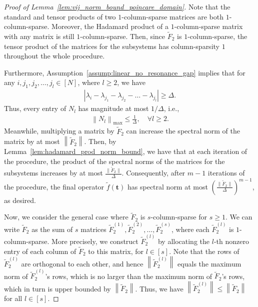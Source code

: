 \documentclass[superscriptaddress,onecolumn,nofootinbib,longbibliography,a4paper,accepted=2026-09-29]{quantumarticle}
\theoremstyle{plain}
\theoremstyle{definition}
\numberwithin{thm}{section}
\numberwithin{assumption}{section}
\numberwithin{lemma}{section}
\numberwithin{prop}{section}
\numberwithin{cor}{section}
\numberwithin{definition}{section}
\numberwithin{rmk}{section}
\numberwithin{equation}{section}
\newcommand{\norm}[1]     {\left\| #1 \right\|}
\newcommand{\mbt}{\mathbf{t}}
\begin{document}
\begin{proof}[Proof of Lemma~\ref{lem:vij_norm_bound_poincare_domain}]
Note that the standard and tensor products of two \(1\)-column-sparse matrices are both \(1\)-column-sparse. Moreover, the Hadamard product of a \(1\)-column-sparse matrix with any matrix is still \(1\)-column-sparse. Then, since \( \tilde{F}_2 \) is \(1\)-column-sparse, the tensor product of the matrices for the subsystems has column-sparsity $1$ throughout the whole procedure.

Furthermore, Assumption~\ref{assump:linear_no_resonance_gap} implies that for any $i, j_1,j_2,\dots,j_l \in [N]$, where $l \ge 2$, we have 
\begin{align}
|\lambda_i - \lambda_{j_1}-\lambda_{j_2}-\dots-\lambda_{j_l}|\ge \Delta.    
\end{align}
Thus, every entry of \( N_l \) has magnitude at most \( 1/\Delta \), i.e., 
\begin{align}
\norm{N_l}_{\mathrm{max}} \le \frac{1}{\Delta}, \quad \forall l \ge 2.
\end{align}
Meanwhile, multiplying a matrix by $\tilde{F}_2$ can increase the spectral norm of the matrix by at most $\norm{\tilde{F}_2}$. Then, by Lemma~\ref{lem:hadamard_prod_norm_bound}, we have that at each iteration of the procedure, the product of the spectral norms of the matrices for the subsystems increases by at most \( \frac{ \| \tilde{F}_2 \|}{\Delta} \). Consequently, after $m-1$ iterations of the procedure, the final operator $\tilde{f}(\mbt)$ has spectral norm at most \(\left( \frac{\| \tilde{F}_2 \|}{\Delta} \right)^{m-1} \), as desired.

Now, we consider the general case where $\tilde{F}_2$ is $s$-column-sparse for $s \ge 1$. We can write $\tilde{F}_2$ as the sum of $s$ matrices $\tilde{F}_2^{(1)}, \tilde{F}_2^{(2)}, \dots, \tilde{F}_2^{(s)}$,
where each $\tilde{F}_2^{(l)}$ is $1$-column-sparse. More precisely, we construct $\tilde{F}_2^{(l)}$ by allocating the $l$-th nonzero entry of each column of $\tilde{F}_2$ to this matrix, for $l \in [s]$. Note that the rows of $\tilde{F}_2^{(l)}$ are orthogonal to each other, and hence $\norm{\tilde{F}_2^{(l)}}$ equals the maximum norm of $\tilde{F}_2^{(l)}$'s rows, which is no larger than the maximum norm of $\tilde{F}_2$'s rows, which in turn is upper bounded by $\norm{\tilde{F}_2}$. Thus, we have $\norm{\tilde{F}_2^{(l)}} \le \norm{\tilde{F}_2}$ for all $l \in [s]$. 


\end{proof}
\end{document}
